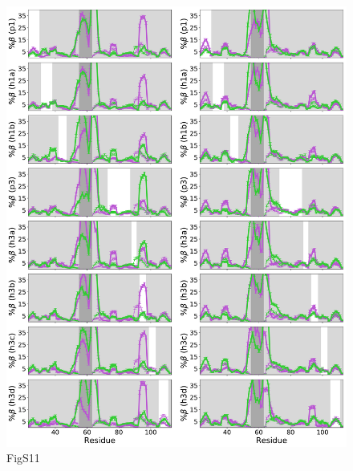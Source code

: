 \documentclass[10pt,letterpaper]{article}
\begin{document}
\begin{figure}[!ht]
\includegraphics[scale=0.5,width=\textwidth,trim={0 0cm 0 0cm},clip]{./figures/S11.pdf}
\caption{{FigS11}}
\end{figure}
\end{document}
